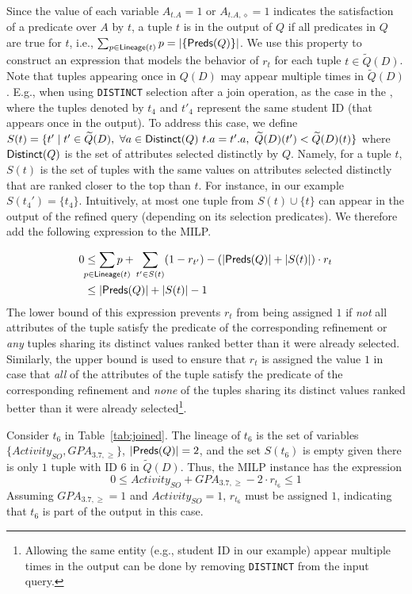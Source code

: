 Since the value of each variable $A_{t.A} = 1$ or $A_{t.A, \diamond} = 1$ indicates the satisfaction of a predicate over $A$ by $t$, a tuple $t$ is in the output of $Q$ if all predicates in $Q$ are true for $t$, i.e., $\sum_{p \in \textsf{Lineage}(t)} p = |\{\textsf{Preds}(Q)\}|$. We use this property to construct an expression that models the behavior of $r_t$ for each tuple $t\in\widetilde{Q}(D)$.
Note that tuples appearing once in $Q(D)$ may appear multiple times in  $\widetilde{Q}(D)$. E.g., when using {\tt DISTINCT} selection after a join operation, as the case in the \running{}, where the tuples denoted by $t_4$ and $t'_4$ represent the same student ID (that appears once in the output). To address this case, we define $S(t) = \{ t' \mid t' \in \widetilde{Q}(D),\ \forall a \in {\sf Distinct}(Q)\ t.a = t'.a,\ \widetilde{Q}(D)(t') < \widetilde{Q}(D)(t) \}$ where ${\sf Distinct}(Q)$ is the set of attributes selected distinctly by $Q$. Namely, for a tuple $t$, $S(t)$ is the set of tuples with the same values on attributes selected distinctly that are ranked closer to the top than $t$. For instance, in our example $S(t_4') = \{ t_4 \}$. Intuitively, at most one tuple from $S(t)\cup\{t\}$ can appear in the output of the refined query (depending on its selection predicates). We therefore add the following expression to the MILP. 


\begin{align}
\begin{split}
0 &\leq \sum_{\mathclap{p \in \prov(t)}} p + \sum_{t' \in S(t)} (1 - r_{t'}) - (|\conds(Q)| + |S(t)|) \cdot r_t \label{eq:tuple_in_ranking_inline} \\
  &\leq |\conds(Q)| + |S(t)| - 1
\end{split}
\end{align}
The lower bound of this expression prevents $r_t$ from being assigned $1$ if {\it not} all attributes of the tuple satisfy the predicate of the corresponding refinement or {\it any} tuples sharing its distinct values ranked better than it were already selected. Similarly, the upper bound is used to ensure that $r_t$ is assigned the value $1$ in case that {\it all} of the attributes of the tuple satisfy the predicate of the corresponding refinement and {\it none} of the tuples sharing its distinct values ranked better than it were already selected\footnote{Allowing the same entity (e.g., student ID in our example) appear multiple times in the output can be done by removing {\tt DISTINCT} from the input query.}.

\begin{example}
\label{ex:tuple-in-ranking}
Consider $t_6$ in Table~\ref{tab:joined}.
The lineage of $t_6$ is the set of variables $\{Activity_{SO}, GPA_{3.7, \geq}\}$, $|\textsf{Preds}(Q)| = 2$, and the set $S(t_6)$ is empty given there is only $1$ tuple with ID $6$ in $\widetilde{Q}(D)$. Thus, the MILP instance has the expression 
$$0 \leq Activity_{SO} + GPA_{3.7, \geq} - 2 \cdot r_{t_6} \leq 1$$
Assuming $GPA_{3.7, \geq} = 1$ and $Activity_{SO} =1$, $r_{t_6}$ must be assigned $1$, indicating that $t_6$ is part of the output in this case. 



\end{example}




